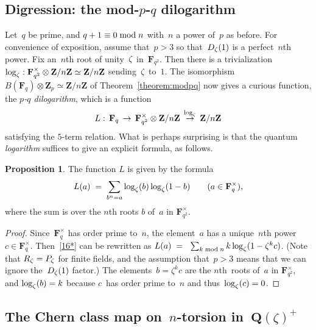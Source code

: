 \documentclass[12pt,reqno]{amsart}
\theoremstyle{definition}
\newtheorem{proposition}[theorem]{Proposition}
\newcommand{\changed}[1]{{#1}}
\def\={\;=\;}
\def\mod{\;\text{\rm mod}\;}
\def\Q{\mathbf Q}   %
\def\Z{\mathbf Z}   %
\def\F{\mathbf F}   %
\def\nn{n}
\begin{document}
\subsection{Digression: the \texorpdfstring{mod-$p$-$q$}{modpq} 
dilogarithm}
\label{modpqdilog}

Let~$q$ be prime, and $q + 1 \equiv 0 \mod \nn$ with~$\nn$ a power of~$p$ 
as before. \changed{For convenience of exposition, assume that~$p > 3$ so that~$D_{\zeta}(1)$
is a perfect~$\nn$th power.}
Fix an~$\nn$th root of unity~$\zeta$ in~$\F_{q^2}$. Then there is 
a trivialization $\log_{\z}: \F^{\times}_{q^2} \otimes \Z/\nn \Z \simeq \Z/\nn \Z$
sending~$\zeta$ to~$1$. The isomorphism~$B(\F_q) \otimes \Z_p
\simeq \Z/\nn \Z$ of Theorem~\ref{theorem:modpq} now
gives a curious function,
the {\it $p$-$q$ dilogarithm}, which is a function
$$
L: \,\F_q \,\rightarrow\, \F^{\times}_{q^2} \otimes 
\Z/\nn \Z \, \overset{\log_{\z}}\rightarrow \, \Z/\nn \Z
$$
satisfying the $5$-term relation. What is perhaps surprising is that 
the quantum {\it logarithm} suffices to give an explicit formula, 
as follows. 

\begin{proposition}
The function $L$ is given by the formula
$$
L(a) \=  \sum_{b^{\nn}=a}\log_\z(b)\log_\z(1-b) \qquad(a\in\F_q^\times), 
$$
where the sum is over the $\nn$th roots $b$ of~$a$ in $\F_{q^2}^\times$.
\end{proposition}

\begin{proof} 
Since~$\F^{\times}_q$ has order prime to~$\nn$, the element~$a$ has a 
unique~$\nn$th power~$c \in \F^{\times}_q$. 
Then~\eqref{16*} can be rewritten as
$L(a) \= \ \sum_{k \mod \nn} k \log_{\z}(1 - \zeta^k c)$. 
(Note that $R_\zeta=P_\zeta$ for finite fields, \changed{and the assumption that~$p > 3$ means
that we can ignore the~$D_{\zeta}(1)$ factor.}) The elements~$b = \zeta^k c$ 
are the $\nn$th~roots of~$a$ in $\F_{q^2}^\times$, and 
$\log_{\zeta}(b) = k$ because $c$~has 
order prime to~$\nn$ and thus~$\log_{\zeta}(c) = 0$.
\end{proof}

\subsection{The Chern class map on~\texorpdfstring{$n$}{n}-torsion 
in~\texorpdfstring{$\Q(\zeta)^{+}$}{Qzeta}}
\label{subsection:speculative}
\end{document}
